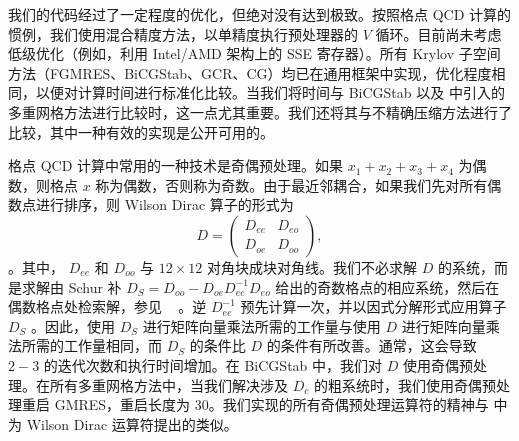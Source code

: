 \documentclass{siamltex}
\begin{document}
我们的代码经过了一定程度的优化，但绝对没有达到极致。按照格点 QCD 计算的惯例，我们使用混合精度方法，以单精度执行预处理器的    $V$    循环。目前尚未考虑低级优化（例如，利用 Intel/AMD 架构上的 SSE 寄存器）。所有 Krylov 子空间方法（FGMRES、BiCGStab、GCR、CG）均已在通用框架中实现，优化程度相同，以便对计算时间进行标准化比较。当我们将时间与 BiCGStab 以及    \cite{MGClark2010_1,MGClark2007,MGClark2010_2}    中引入的多重网格方法进行比较时，这一点尤其重要。我们还将其与不精确压缩方法进行了比较，其中一种有效的实现是公开可用的。

格点 QCD 计算中常用的一种技术是奇偶预处理。如果    $x_1+x_2+x_3+x_4$    为偶数，则格点    $x$    称为偶数，否则称为奇数。由于最近邻耦合，如果我们先对所有偶数点进行排序，则 Wilson Dirac 算子的形式为
\[
  D = \left( \begin{matrix} D_{ee} & D_{eo}  \\  D_{oe} & D_{oo} \end{matrix} \right),
\]   。其中，   $D_{ee}$    和    $D_{oo}$    与    $12 \times 12$    对角块成块对角线。我们不必求解    $D$    的系统，而是求解由 Schur 补    $D_S = D_{oo}-D_{oe}D_{ee}^{-1}D_{eo}$    给出的奇数格点的相应系统，然后在偶数格点处检索解，参见 \     \cite{MGClark2010_2}    。逆    $D_{ee}^{-1}$    预先计算一次，并以因式分解形式应用算子    $D_S$   。因此，使用    $D_S$    进行矩阵向量乘法所需的工作量与使用    $D$    进行矩阵向量乘法所需的工作量相同，而    $D_S$    的条件比    $D$    的条件有所改善。通常，这会导致    $2-3$    的迭代次数和执行时间增加。在 BiCGStab 中，我们对    $D$    使用奇偶预处理。在所有多重网格方法中，当我们解决涉及    $D_c$    的粗系统时，我们使用奇偶预处理重启 GMRES，重启长度为 30。我们实现的所有奇偶预处理运算符的精神与    \cite{Krieg:2010zz}    中为 Wilson Dirac 运算符提出的类似。
\end{document}
